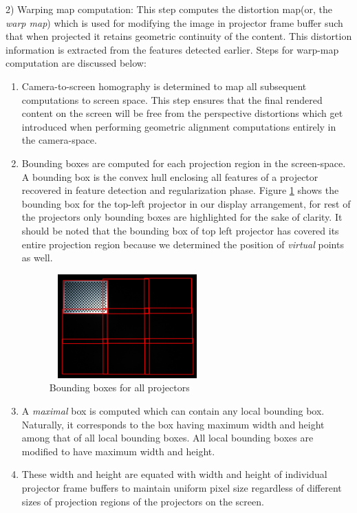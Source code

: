 \documentclass[letterpaper,10pt,conference]{/home/pranav/Desktop/Publication_work/latex_class_files/IEEEtran}
\begin{document}
2) Warping map computation: This step computes the distortion map(or, the \textit{warp map}) which is used for modifying the image in projector frame buffer such that when projected it retains geometric continuity of the content. This distortion information is extracted from the features detected earlier. Steps for warp-map computation are discussed below:
\begin{enumerate}	     
\item Camera-to-screen homography\cite{elan} is determined to map all subsequent computations to screen space. This step ensures that the final rendered content on the screen will be free from the perspective distortions which get introduced when performing geometric alignment computations entirely in the camera-space.
\item Bounding boxes are computed for each projection region in the screen-space. A bounding box is the convex hull enclosing all features of a projector recovered in feature detection and regularization phase. Figure \ref{all_bboxes} shows the bounding box for the top-left projector in our display arrangement, for rest of the projectors only bounding boxes are highlighted for the sake of clarity. It should be noted that the bounding box of top left projector has covered its entire projection region because we determined the position of \textit{virtual} points as well. 

\begin{figure}
\centering
\includegraphics[width=6cm,height=4cm]{figures/all_bboxes.jpg}
\caption{Bounding boxes for all projectors}
\label{all_bboxes}
\end{figure}


\item  A \textit{maximal} box is computed which can contain any local bounding box. Naturally, it corresponds to the box having maximum width and height among that of all local bounding boxes. All local bounding boxes are modified to have maximum width and height.

\item These width and height are equated with width and height of individual projector frame buffers to maintain uniform pixel size regardless of different sizes of projection regions of the projectors on the screen. 


\end{enumerate}
\end{document}
